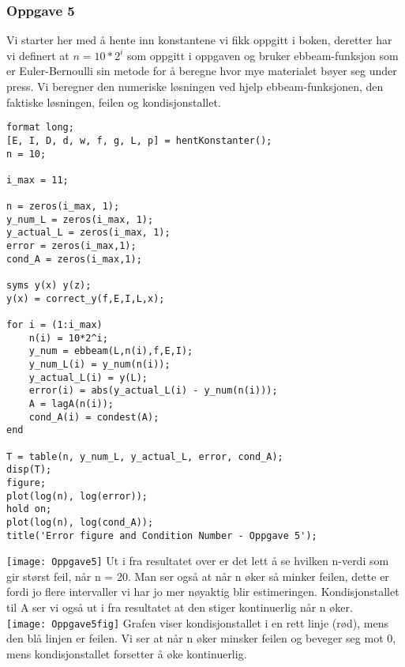 \subsubsection{Oppgave 5}
Vi starter her med å hente inn konstantene vi fikk oppgitt i boken, deretter har vi definert at $n=10*2^{i}$ som oppgitt i oppgaven og bruker ebbeam-funksjon som er 
Euler-Bernoulli sin metode for å beregne hvor mye materialet bøyer seg under press. 
Vi beregner den numeriske løsningen ved hjelp ebbeam-funksjonen, den faktiske løsningen, feilen og kondisjonstallet. 
\begin{lstlisting}
format long;
[E, I, D, d, w, f, g, L, p] = hentKonstanter();
n = 10;

i_max = 11;

n = zeros(i_max, 1);
y_num_L = zeros(i_max, 1);
y_actual_L = zeros(i_max, 1);
error = zeros(i_max,1);
cond_A = zeros(i_max,1);

syms y(x) y(z);
y(x) = correct_y(f,E,I,L,x);

for i = (1:i_max)
    n(i) = 10*2^i;
    y_num = ebbeam(L,n(i),f,E,I);
    y_num_L(i) = y_num(n(i));
    y_actual_L(i) = y(L);
    error(i) = abs(y_actual_L(i) - y_num(n(i)));
    A = lagA(n(i));
    cond_A(i) = condest(A);
end

T = table(n, y_num_L, y_actual_L, error, cond_A);
disp(T);
figure;
plot(log(n), log(error));
hold on;
plot(log(n), log(cond_A));
title('Error figure and Condition Number - Oppgave 5');
\end{lstlisting}

\texttt{[image: Oppgave5]}
Ut i fra resultatet over er det lett å se hvilken n-verdi som gir størst feil, når n = 20. Man ser også at når n øker så minker feilen, dette er fordi jo flere intervaller vi har jo mer nøyaktig blir estimeringen. Kondisjonstallet til A ser vi også ut i fra resultatet at den stiger kontinuerlig når n øker. \\
\texttt{[image: Oppgave5fig]}
Grafen viser kondisjonstallet i en rett linje (rød), mens den blå linjen er feilen. Vi ser at når n øker minsker feilen og beveger seg mot 0, mens kondisjonstallet forsetter å øke kontinuerlig. 